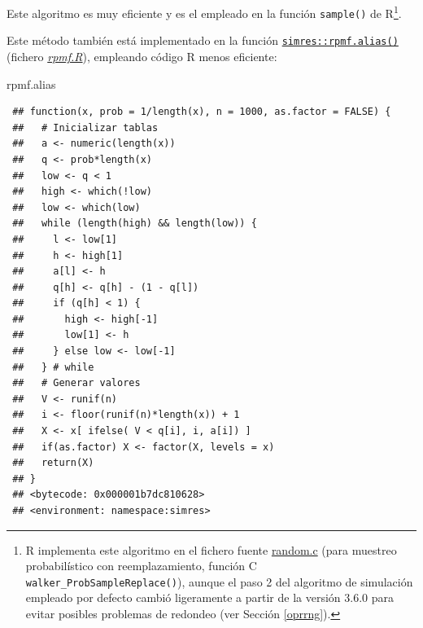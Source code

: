 \documentclass[
]{book}
\newenvironment{Shaded}{\begin{snugshade}}{\end{snugshade}}
\newcommand{\NormalTok}[1]{#1}
\theoremstyle{break}
\theoremstyle{nonumberplain}
\begin{document}
Este algoritmo es muy eficiente y es el empleado en la función \texttt{sample()} de R\footnote{R implementa este algoritmo en el fichero fuente \href{https://svn.r-project.org/R/trunk/src/main/random.c}{random.c} (para muestreo probabilístico con reemplazamiento, función C \texttt{walker\_ProbSampleReplace()}), aunque el paso 2 del algoritmo de simulación empleado por defecto cambió ligeramente a partir de la versión 3.6.0 para evitar posibles problemas de redondeo (ver Sección \ref{oprrng}).}.

Este método también está implementado en la función \href{https://rubenfcasal.github.io/simres/reference/rpmf.alias.html}{\texttt{simres::rpmf.alias()}} (fichero \href{R/rpmf.R}{\emph{rpmf.R}}), empleando código R menos eficiente:

\begin{Shaded}
\begin{Highlighting}[]
\NormalTok{rpmf.alias}
\end{Highlighting}
\end{Shaded}

\begin{verbatim}
 ## function(x, prob = 1/length(x), n = 1000, as.factor = FALSE) {
 ##   # Inicializar tablas
 ##   a <- numeric(length(x))
 ##   q <- prob*length(x)
 ##   low <- q < 1
 ##   high <- which(!low)
 ##   low <- which(low)
 ##   while (length(high) && length(low)) {
 ##     l <- low[1]
 ##     h <- high[1]
 ##     a[l] <- h
 ##     q[h] <- q[h] - (1 - q[l])
 ##     if (q[h] < 1) {
 ##       high <- high[-1]
 ##       low[1] <- h
 ##     } else low <- low[-1]
 ##   } # while
 ##   # Generar valores
 ##   V <- runif(n)
 ##   i <- floor(runif(n)*length(x)) + 1
 ##   X <- x[ ifelse( V < q[i], i, a[i]) ]
 ##   if(as.factor) X <- factor(X, levels = x)
 ##   return(X)
 ## }
 ## <bytecode: 0x000001b7dc810628>
 ## <environment: namespace:simres>
\end{verbatim}
\end{document}
